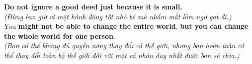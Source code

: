 \begin{baihoc}
  \textbf{Do not ignore a good deed just because it is small.}\\
  \textit{(Đừng bao giờ vì một hành động tốt nhỏ bé mà nhắm mắt làm ngơ gạt đi.)}\\
  You \textbf{might not be able to change the entire world}, \textbf{but you can change the whole world for one person}.\\
  \textit{(Bạn có thể không đủ quyền năng thay đổi cả thế giới, nhưng bạn hoàn toàn có thể thay đổi toàn bộ thế giới đối với một cá nhân duy nhất được bạn sẻ chia.)}
\end{baihoc}

\vspace{0.8cm}


\ngayDay{}

